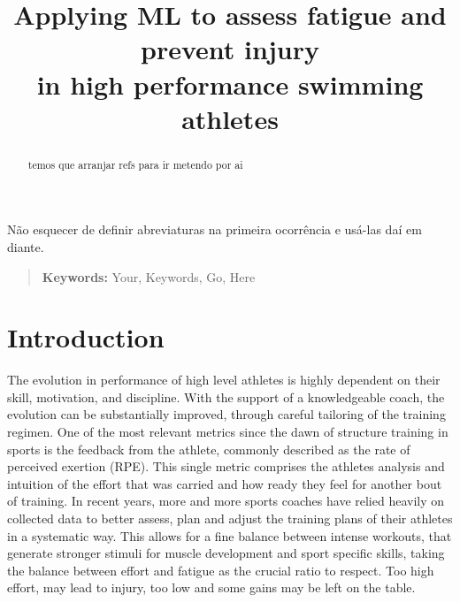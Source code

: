 \documentclass[conference]{IEEEtran}
\begin{document}
\title{Applying ML to assess fatigue and prevent injury\\in high performance swimming athletes}

\author{
\and
{}
}


\maketitle
\thispagestyle{plain}

\begin{abstract}
temos que arranjar refs para ir metendo por ai
\end{abstract}
Não esquecer de definir abreviaturas na primeira ocorrência e usá-las daí em diante.


\begin{quote}
\small
\noindent
\textbf{Keywords:} Your, Keywords, Go, Here
\end{quote}

\IEEEpeerreviewmaketitle


\section{Introduction}
The evolution in performance of high level athletes is highly dependent on their skill, motivation, and discipline. With the support of a knowledgeable coach, the evolution can be substantially improved, through careful tailoring of the training regimen. One of the most relevant metrics since the dawn of structure training in sports is the feedback from the athlete, commonly described as the rate of perceived exertion (RPE). This single metric comprises the athletes analysis and intuition of the effort that was carried and how ready they feel for another bout of training. In recent years, more and more sports coaches have relied heavily on collected data to better assess, plan and adjust the training plans of their athletes in a systematic way. This allows for a fine balance between intense workouts, that generate stronger stimuli for muscle development and sport specific skills, taking the balance between effort and fatigue as the crucial ratio to respect. Too high effort, may lead to injury, too low and some gains may be left on the table. 
\end{document}
